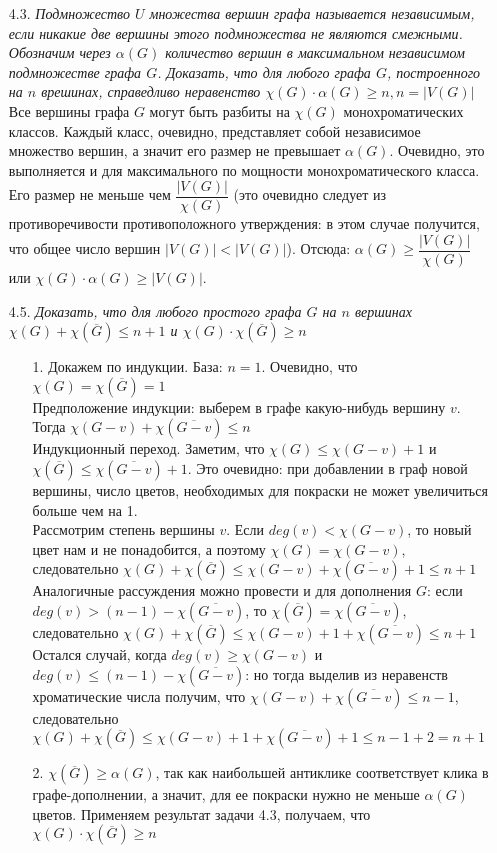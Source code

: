 \documentclass[10pt,a4paper]{article}
\begin{document}
\begin{enumerate}
	\item[4.3.] \textit{Подмножество $U$ множества вершин графа называется независимым, если никакие две вершины этого подмножества не являются смежными. Обозначим через $\alpha(G)$ количество вершин в максимальном независимом подмножестве графа $G$. Доказать, что для любого графа $G$, построенного на $n$ врешинах, справедливо неравенство $\chi(G) \cdot \alpha(G) \geqslant n, n=|V(G)|$ }\\
	Все вершины графа $G$ могут быть разбиты на $\chi(G)$ монохроматических классов. Каждый класс, очевидно, представляет собой независимое множество вершин, а значит его размер не превышает $\alpha(G)$. Очевидно, это выполняется и для максимального по мощности монохроматического класса. Его размер не меньше чем $\dfrac{|V(G)|}{\chi(G)}$ (это очевидно следует из противоречивости противоположного утверждения: в этом случае получится, что общее число вершин $|V(G)| < |V(G)|$). Отсюда: $\alpha(G) \geqslant \dfrac{|V(G)|}{\chi(G)}$ или $\chi(G) \cdot \alpha(G) \geqslant |V(G)|$.
	
	\item[4.5.] \textit{Доказать, что для любого простого графа $G$ на $n$ вершинах $\chi(G) + \chi(\overline{G}) \leqslant n+1$ и $\chi(G) \cdot \chi(\overline{G}) \geqslant n$}
	
	\begin{enumerate}
		\item[1.] Докажем по индукции. База: $n=1$. Очевидно, что $\chi(G) =\chi(\overline{G}) = 1$\\
		Предположение индукции: выберем в графе какую-нибудь вершину $v$. Тогда $\chi(G-v) + \chi(\overline{G-v}) \leqslant n$\\
		Индукционный переход. Заметим, что $\chi(G) \leqslant \chi(G-v) + 1$ и $\chi(\overline{G}) \leqslant \chi(\overline{G-v}) + 1$. Это очевидно: при добавлении в граф новой вершины, число цветов, необходимых для покраски не может увеличиться больше чем на 1.\\
		Рассмотрим степень вершины $v$. Если $deg(v) < \chi(G-v)$, то новый цвет нам и не понадобится, а поэтому $\chi(G) = \chi(G-v)$, следовательно $\chi(G) + \chi(\overline{G}) \leqslant \chi(G-v) + \chi(\overline{G-v}) + 1 \leqslant n + 1$\\
		Аналогичные рассуждения можно провести и для дополнения $G$: если $deg(v) > (n-1) - \chi(\overline{G-v})$, то $\chi(\overline{G}) = \chi(\overline{G-v})$, следовательно $\chi(G) + \chi(\overline{G}) \leqslant \chi(G-v) + 1 + \chi(\overline{G-v}) \leqslant n + 1$
		Остался случай, когда $deg(v) \geqslant \chi(G-v)$ и $deg(v) \leqslant (n-1) - \chi(\overline{G-v})$: но тогда выделив из неравенств хроматические числа получим, что $\chi(G-v) + \chi(\overline{G-v}) \leqslant n-1$, следовательно $\chi(G) + \chi(\overline{G}) \leqslant \chi(G-v) + 1 + \chi(\overline{G-v}) + 1 \leqslant n - 1+ 2 = n+1$
		\item[2.] $\chi(\overline{G}) \geqslant \alpha(G)$, так как наибольшей антиклике соответствует клика в графе-дополнении, а значит, для ее покраски нужно не меньше $\alpha(G)$ цветов. Применяем результат задачи 4.3, получаем, что $\chi(G) \cdot \chi(\overline{G}) \geqslant n$
	\end{enumerate}
	

\end{enumerate}
\end{document}

